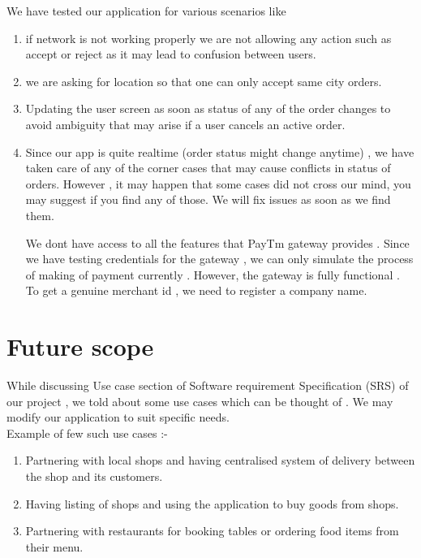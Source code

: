 \documentclass{report}
\begin{document}
We have tested our application for various scenarios like
\begin{enumerate}[label=\roman*)]
\item  if network is not working properly we are not allowing any action such as accept or reject as it may lead to confusion between users.
\item we are asking for location so that one can only accept same city orders.
\item  Updating the user screen as soon as status of any of the order changes to avoid ambiguity that may arise if a user cancels an active order.
\item Since our app is quite realtime (order status might change anytime) , we have taken care of any of the corner cases that may cause conflicts in status of orders. However , it may happen that some cases did not cross our mind, you may suggest if you find any of those. We will fix issues as soon as we find them.

\par We don\textquotesingle t have access to all the features that PayTm gateway provides . Since we have testing credentials for the gateway , we can only simulate the process of making of payment currently  . However, the gateway is fully functional .
To get a genuine merchant id , we need to register a company name.

\end{enumerate}


\chapter{Future scope}
\bigskip
\bigskip
\bigskip
\bigskip

While discussing Use case section of Software requirement Specification (SRS) of our project , we told about some use cases which can be thought of .
We may modify our application to suit specific needs.\\

Example of few such use cases :-
\begin{enumerate}[label=(\roman*.)]
\item Partnering with local shops and having centralised system of delivery between the shop and its customers. 
\item Having listing of shops and using the application to buy goods from shops.
\item Partnering with restaurants for booking tables or ordering food items from their menu.

\end{enumerate}
\end{document}
